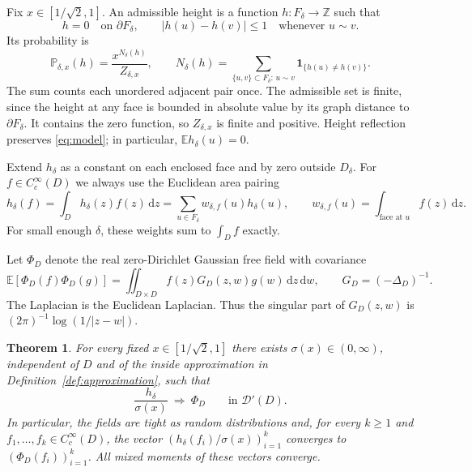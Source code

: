 \documentclass[11pt]{article}
\newtheorem{theorem}{Theorem}[section]
\theoremstyle{definition}
\theoremstyle{remark}
\numberwithin{equation}{section}
\begin{document}
Fix $x\in[1/\sqrt2,1]$.  An admissible height is a function
$h:F_\delta\to\mathbb Z$ such that
\[
 h=0\quad\text{on }\partial F_\delta,
 \qquad |h(u)-h(v)|\le1\quad\text{whenever }u\sim v.
\]
Its probability is
\begin{equation}\label{eq:model}
 \mathbb P_{\delta,x}(h)=\frac{x^{N_\delta(h)}}{Z_{\delta,x}},
 \qquad
 N_\delta(h)=\sum_{\{u,v\}\subset F_\delta:\,u\sim v}
                 \mathbf 1_{\{h(u)\ne h(v)\}}.
\end{equation}
The sum counts each unordered adjacent pair once.  The admissible set is
finite, since the height at any face is bounded in absolute value by its
graph distance to $\partial F_\delta$.  It contains the zero function, so
$Z_{\delta,x}$ is finite and positive.  Height reflection preserves
\eqref{eq:model}; in particular, $\mathbb E h_\delta(u)=0$.

Extend $h_\delta$ as a constant on each enclosed face and by zero outside
$D_\delta$.  For $f\in C_c^\infty(D)$ we always use the Euclidean area
pairing
\begin{equation}\label{eq:area-pairing}
 h_\delta(f)=\int_D h_\delta(z)f(z)\,\mathrm d z
 =\sum_{u\in F_\delta} w_{\delta,f}(u)h_\delta(u),
 \qquad w_{\delta,f}(u)=\int_{\text{face at }u}f(z)\,\mathrm d z.
\end{equation}
For small enough $\delta$, these weights sum to $\int_D f$ exactly.

Let $\Phi_D$ denote the real zero-Dirichlet Gaussian free field with
covariance
\begin{equation}\label{eq:gff-covariance}
 \mathbb E[\Phi_D(f)\Phi_D(g)]
 =\iint_{D\times D} f(z)G_D(z,w)g(w)\,\mathrm d z\,\mathrm d w,
 \qquad G_D=(-\Delta_D)^{-1}.
\end{equation}
The Laplacian is the Euclidean Laplacian.  Thus the singular part of
$G_D(z,w)$ is $(2\pi)^{-1}\log(1/|z-w|)$.

\begin{theorem}\label{thm:main}
For every fixed $x\in[1/\sqrt2,1]$ there exists
$\sigma(x)\in(0,\infty)$, independent of $D$ and of the inside approximation
in Definition~\ref{def:approximation}, such that
\[
 \frac{h_\delta}{\sigma(x)}\ \Longrightarrow\ \Phi_D
 \qquad\text{in }\mathcal D'(D).
\]
In particular, the fields are tight as random distributions and, for every
$k\ge1$ and $f_1,\ldots,f_k\in C_c^\infty(D)$, the vector
$(h_\delta(f_i)/\sigma(x))_{i=1}^k$ converges to
$(\Phi_D(f_i))_{i=1}^k$.  All mixed moments of these vectors converge.
\end{theorem}
\end{document}
